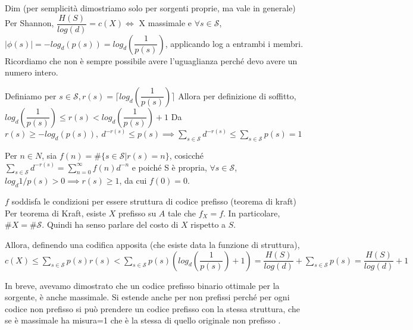 Dim (per semplicità dimostriamo solo per sorgenti proprie, ma vale in generale)
Per Shannon, $\dfrac{H(S)}{log(d)}=c(X)\iff$ X massimale e $\forall s \in \mathcal{S}$, $|\phi(s)|=-log_d(p(s))=log_d(\dfrac{1}{p(s)})$, applicando log a entrambi i membri. Ricordiamo che non è sempre possibile avere l'uguaglianza perché devo avere un numero intero.

Definiamo per $s\in \mathcal{S}, r(s)=\lceil log_d(\dfrac{1}{p(s)}) \rceil$
Allora per definizione di soffitto, $log_d(\dfrac{1}{p(s)}) \le r(s) \lt log_d(\dfrac{1}{p(s)})+1$
Da $r(s) \ge -log_d(p(s)), \ d^{-r(s)}\le p(s) \implies \sum_{s\in \mathcal{S}}d^{-r(s)} \le \sum_{s\in\mathcal{S}}p(s)=1$

Per $n \in N$, sia $f(n)=\#\{s\in \mathcal{S} | r(s) = n\}$, cosicché $\sum_{s\in \mathcal{S}}d^{-r(s)} = \sum_{n=0}^{\infty}f(n)d^{-n}$ e poiché S è propria, $\forall s\in \mathcal{S}$, $log_d 1/p(s) \gt 0 \implies r(s) \ge 1$, da cui $f(0)=0$.

$f$ soddisfa le condizioni per essere struttura di codice prefisso (teorema di kraft)
Per teorema di Kraft, esiste $X$ prefisso su $A$ tale che $f_X=f$.
In particolare, $\#X=\#\mathcal S$. Quindi ha senso parlare del costo di $X$ rispetto a $S$.

Allora, definendo una codifica apposita (che esiste data la funzione di struttura), $c(X) \le \sum_{s\in \mathcal{S}} p(s)r(s) \lt \sum_{s\in\mathcal S} p(s)(log_d(\dfrac{1}{p(s)})+1) = \dfrac{H(S)}{log(d)} + \sum_{s\in\mathcal S} p(s)= \dfrac{H(S)}{log(d)} + 1$


In breve, avevamo dimostrato che un codice prefisso binario ottimale per la sorgente, è anche massimale. Si estende anche per non prefissi perché per ogni codice non prefisso si può prendere un codice prefisso con la stessa struttura, che se è massimale ha misura=1 che è la stessa di quello originale non prefisso .